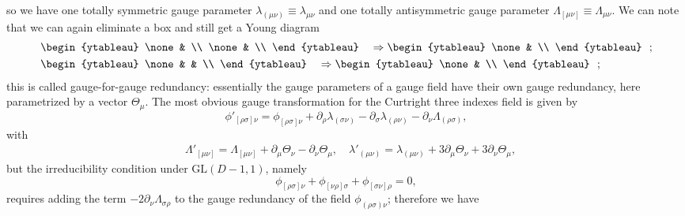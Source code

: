 \documentclass[a4paper,12pt]{article}
\begin{document}
so we have one totally symmetric gauge parameter $\lambda_{(\mu \nu)}\equiv \lambda_{\mu \nu}$ and one totally antisymmetric gauge parameter $\Lambda_{[\mu \nu]} \equiv \Lambda_{\mu \nu}$. We can note that we can again eliminate a box and still get a Young diagram
\begin{equation}
\begin{aligned}
    &\begin{ytableau}
  \none & \\
  \none  & \\
\end{ytableau}  \ \ \ \Rightarrow  \begin{ytableau}
  \none & \\
\end{ytableau} \ \ ;\\
&\begin{ytableau}
  \none & & \\
\end{ytableau} \ \ \ \Rightarrow \begin{ytableau}
  \none & \\
\end{ytableau} \ \ ;
\end{aligned}
\end{equation}
this is called gauge-for-gauge redundancy: essentially the gauge parameters of a gauge field have their own gauge redundancy, here parametrized by a vector $\Theta_{\mu}$. The most obvious gauge transformation for the Curtright three indexes field is given by
\begin{equation}
    \phi'_{[\rho \sigma] \nu} = \phi_{[\rho \sigma ]\nu}+\partial_{\rho}\lambda_{(\sigma \nu)}-\partial_{\sigma}\lambda_{(\rho \nu)}-\partial_{\nu}\Lambda_{(\rho \sigma)},
\end{equation}
with
\begin{equation}
\begin{aligned}
&\Lambda'_{[\mu \nu]}=\Lambda_{[\mu \nu]}+\partial_{\mu}\Theta_{\nu}-\partial_{\nu}\Theta_{\mu}, \quad \lambda'_{(\mu \nu)}=\lambda_{(\mu \nu)}+3\partial_{\mu}\Theta_{\nu}+3\partial_{\nu}\Theta_{\mu},
\label{gfg}
\end{aligned}    
\end{equation}
but the irreducibility condition under $\mathrm{GL}(D-1,1)$, namely 
\begin{equation}
\phi_{[\rho \sigma]\nu}+\phi_{[\nu \rho]\sigma}+\phi_{[\sigma \nu ]\rho}=0,
\label{irregl}
\end{equation} 
requires adding the term $-2\partial_{\nu}\Lambda_{\sigma \rho}$ to the gauge redundancy of the field $\phi_{(\rho \sigma )\nu}$; therefore we have 
\end{document}

